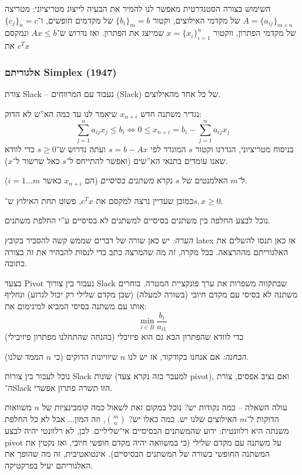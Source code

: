 \documentclass[]{../../../../tex/classes/styledArticle}
\begin{document}
	השימוש בצורה הסטנדרטית מאפשר לנו להמיר את הבעיה לייצוג מטריציוני: מטריצה $A = \{a_{ij}\}_{m \times n}$ של מקדמי האילוצים, וקטור $\{b_i\}_{m} = b$ של מקדמים חופשים, ו־$\{c_j\}_{n} = c$ של מקדמי הפתרון, ווקטור $x = \{x_i\}_{i = 1}^{n}$ שמייצג את הפתרון. ואז נדרוש ש־$Ax \le b$ ונמקסם את $c^Tx$
	
	\subsubsection*{אלגוריתם Simplex (1947)}
	צורת Slack -- נעבוד עם המרווחים (Slack) של כל אחד מהאילוצים. 
	
	נגדיר משתנה חדש $x_{n + i}$ שיאמר לנו עד כמה הא''ש לא הדוק: 
	\[ \sum_{j = 1}^{n} a_{ij} x_j \le b_i \iff 0 \le x_{n + i} = b_i - \sum_{j =1}^{n}a_{ij}x_j \]
	בניסוח מטריציוני, הגדרנו וקטור $s$ המוגדר לפי $s = b - Ax$ ועתה נדרוש ש־$s \ge 0$ כדי לוודא שאנו עומדים בתנאי הא''שים (ואפשר להתייחס ל־$s$ כאל שרשור ל־$x$). 
	
	ל־$m$ האלמנטים של $s$ נקרא \textit{משתנים בסיסיים} (הם $x_{n + i}$ כאשר $i = 1 \dots m$). 
	
	כמובן שעדיין נרצה למקסם את $c^{T}x$, פשוט תחת האילוץ ש־$s,  x \ge 0$. 
	
	נוכל לבצע החלפה בין משתנים בסיסיים למשתנים לא בסיסיים ע''י החלפת משתנים. 
	
	\textit{הערה: }יש כאן שורה של דברים שממש קשה להסביר בקובץ latex אז כאן תנסו להשלים את האלגוריתם מההרצאה. בכל מקרה, זה מה שהמרצה כתב כדי לנסות להבהיר את זה בצורה כתובה. 
	
	בצעד Pivot נעבור בין צורוך Slack שבתקווה משפרות את ערך פונקציית המטרה. בוחרים משתנה לא בסיסי עם מקדם חיובי (בשורה למעלה) (שכן מקדם שלילי רק יכול לגרוע) ונחליף אותו עם משתנה בסיסי המביא למינימום את: 
	\[ \min_{i \in B} \frac{b_i}{a_{i1}} \]
	כדי לוודא שהפתרון הבא גם הוא פיזיבלי (בהנחה שהתחלנו מפתרון פיזיבילי)
	
	\textit{הבחנה: }אם אנחנו בקודקוד, אז יש לנו $n$ שיוויונות הדוקים (כי $n$ הממד שלנו). 
	
	נוכל לעבור בין צורות Slack שונות (למעבר כזה נקרא צעד pivot), ואם נציב אפסים, צורת ה־Slack הזו תשרה פתרון אפשרי. 
	
	עולה השאלה – כמה נקודות יש? נוכל במקום זאת לשאול כמה קומבינציות של $n$ משוואות הדוקות ל־$m$ האילוצים שלנו יש. כמה כאלו יש? $\binom{m}{n}$, וזה המון...  אבל לא כל החלפת משנתה היא רלוונטית: ידוע שהמשתנים הבסיסיים אי־שליליים. לכן, לא רלוונטי יהיה לבצע pivot על משתנה עם מקדם שלילי (כי במשוואה יהיה מקדם חופשי חיובי, ואז נקטין את המשתנה החופשי בשורה של המשתנים הבסיסיים). אינטואטיבית, זה מה שהופך את האלגוריתם יעיל בפרקטיקה. 
	
\end{document}
